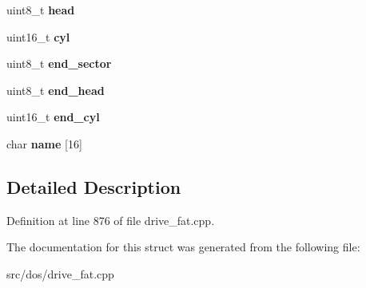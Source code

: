 \begin{DoxyCompactItemize}
\item 
\hypertarget{struct__PC98RawPartition_a159d590fdf1918ef8ba4fa37ffbb896d}{uint8\-\_\-t {\bfseries head}}\label{struct__PC98RawPartition_a159d590fdf1918ef8ba4fa37ffbb896d}

\item 
\hypertarget{struct__PC98RawPartition_ac1a8dc3e314587ea5bceb09b1d960643}{uint16\-\_\-t {\bfseries cyl}}\label{struct__PC98RawPartition_ac1a8dc3e314587ea5bceb09b1d960643}

\item 
\hypertarget{struct__PC98RawPartition_ae9213f512993e8dd4fdbe2409ef3a402}{uint8\-\_\-t {\bfseries end\-\_\-sector}}\label{struct__PC98RawPartition_ae9213f512993e8dd4fdbe2409ef3a402}

\item 
\hypertarget{struct__PC98RawPartition_ad005cde8a52522ccc7efc9e7aa97db80}{uint8\-\_\-t {\bfseries end\-\_\-head}}\label{struct__PC98RawPartition_ad005cde8a52522ccc7efc9e7aa97db80}

\item 
\hypertarget{struct__PC98RawPartition_a23df046ffa51a15203ef87662debd38b}{uint16\-\_\-t {\bfseries end\-\_\-cyl}}\label{struct__PC98RawPartition_a23df046ffa51a15203ef87662debd38b}

\item 
\hypertarget{struct__PC98RawPartition_ac3401e613d79b53415085b2a53c34fab}{char {\bfseries name} \mbox{[}16\mbox{]}}\label{struct__PC98RawPartition_ac3401e613d79b53415085b2a53c34fab}

\end{DoxyCompactItemize}


\subsection{Detailed Description}


Definition at line 876 of file drive\-\_\-fat.\-cpp.



The documentation for this struct was generated from the following file\-:\begin{DoxyCompactItemize}
\item 
src/dos/drive\-\_\-fat.\-cpp\end{DoxyCompactItemize}
